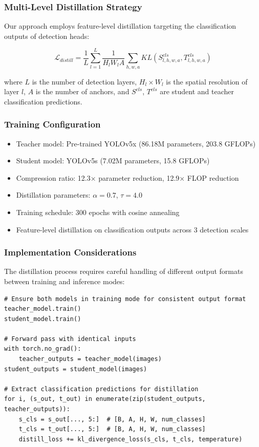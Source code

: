 \documentclass[journal]{IEEEtran}
\begin{document}
\subsubsection{Multi-Level Distillation Strategy}

Our approach employs feature-level distillation targeting the classification outputs of detection heads:

\begin{equation}
\mathcal{L}_{distill} = \frac{1}{L} \sum_{l=1}^{L} \frac{1}{H_l W_l A} \sum_{h,w,a} KL(S_{l,h,w,a}^{cls}, T_{l,h,w,a}^{cls})
\end{equation}

where $L$ is the number of detection layers, $H_l \times W_l$ is the spatial resolution of layer $l$, $A$ is the number of anchors, and $S^{cls}$, $T^{cls}$ are student and teacher classification predictions.

\subsubsection{Training Configuration}

\begin{itemize}
\item Teacher model: Pre-trained YOLOv5x (86.18M parameters, 203.8 GFLOPs)
\item Student model: YOLOv5s (7.02M parameters, 15.8 GFLOPs)
\item Compression ratio: 12.3× parameter reduction, 12.9× FLOP reduction
\item Distillation parameters: $\alpha = 0.7$, $\tau = 4.0$
\item Training schedule: 300 epochs with cosine annealing
\item Feature-level distillation on classification outputs across 3 detection scales
\end{itemize}

\subsubsection{Implementation Considerations}

The distillation process requires careful handling of different output formats between training and inference modes:

\begin{lstlisting}[caption=Teacher-Student Output Alignment]
# Ensure both models in training mode for consistent output format
teacher_model.train()
student_model.train()

# Forward pass with identical inputs
with torch.no_grad():
    teacher_outputs = teacher_model(images)
student_outputs = student_model(images)

# Extract classification predictions for distillation
for i, (s_out, t_out) in enumerate(zip(student_outputs, teacher_outputs)):
    s_cls = s_out[..., 5:]  # [B, A, H, W, num_classes]
    t_cls = t_out[..., 5:]  # [B, A, H, W, num_classes]
    distill_loss += kl_divergence_loss(s_cls, t_cls, temperature)
\end{lstlisting}
\end{document}
